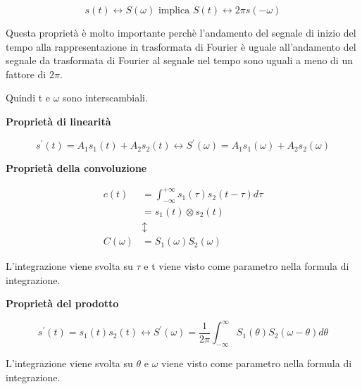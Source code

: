 {
    \Large 
    \begin{equation}
        s(t) \leftrightarrow S(\omega) 
        \text{  implica } 
        S(t) \leftrightarrow 2\pi s(-\omega)
    \end{equation}
}

Questa proprietà è molto importante perchè l'andamento del segnale di inizio del tempo alla 
rappresentazione in trasformata di Fourier è uguale all'andamento del segnale da trasformata 
di Fourier al segnale nel tempo sono uguali a meno di un fattore di $2 \pi$. \newline 

Quindi t e $\omega$ sono interscambiali. \newline 


\textbf{Proprietà di linearità} 

{
    \Large 
    \begin{equation}
        s^{'} (t) = A_1 s_1(t) + A_2 s_2(t) 
        \leftrightarrow 
        S^{'} (\omega) = A_1 s_1(\omega) + A_2 s_2(\omega)
    \end{equation}
} 

\textbf{Proprietà della convoluzione} 

{
    \Large 
    \begin{equation}
        \begin{split}
            c(t) 
            &= \int_{- \infty}^{+\infty} s_1(\tau) s_2(t-\tau) d\tau 
            \\
            &= s_1 (t) \otimes s_2 (t) \\
            &\updownarrow 
            \\ 
           C(\omega) &= S_1(\omega) S_2(\omega)    
        \end{split}
    \end{equation}
}

L'integrazione viene svolta su $\tau$ e t viene visto come parametro nella formula di integrazione. \newline 

\textbf{Proprietà del prodotto}

{
    \Large 
    \begin{equation}
        s^{'} (t) = s_1(t) s_2 (t) 
        \leftrightarrow 
        S^{'}(\omega) = \frac{1}{2 \pi} \int_{-\infty}^{\infty}S_1(\theta) S_2 (\omega - \theta) d\theta
    \end{equation}
}

L'integrazione viene svolta su $\theta$ e $\omega$ viene visto come parametro nella formula di integrazione. \newline 

